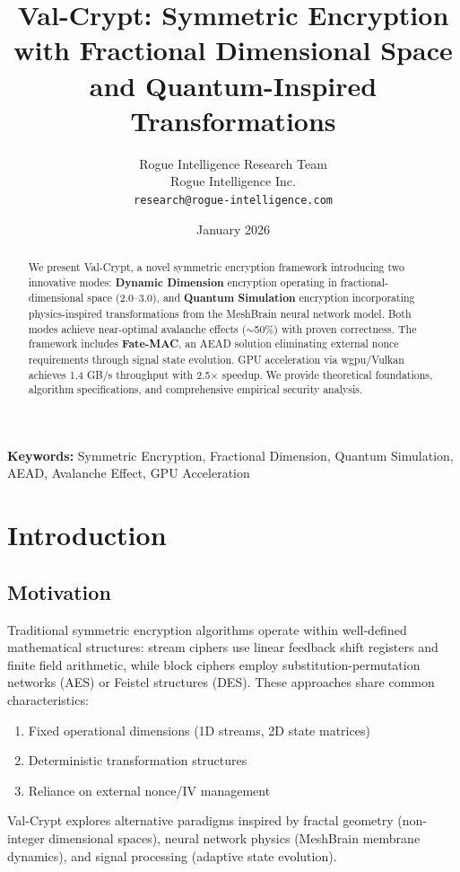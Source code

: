 \documentclass[11pt,a4paper]{article}
\title{Val-Crypt: Symmetric Encryption with Fractional Dimensional Space and Quantum-Inspired Transformations}
\author{
    Rogue Intelligence Research Team\\
    Rogue Intelligence Inc.\\
    \texttt{research@rogue-intelligence.com}
}
\date{January 2026}
\begin{document}
\maketitle

\begin{abstract}
We present Val-Crypt, a novel symmetric encryption framework introducing two innovative modes: \textbf{Dynamic Dimension} encryption operating in fractional-dimensional space (2.0--3.0), and \textbf{Quantum Simulation} encryption incorporating physics-inspired transformations from the MeshBrain neural network model. Both modes achieve near-optimal avalanche effects ($\sim$50\%) with proven correctness. The framework includes \textbf{Fate-MAC}, an AEAD solution eliminating external nonce requirements through signal state evolution. GPU acceleration via wgpu/Vulkan achieves 1.4 GB/s throughput with 2.5$\times$ speedup. We provide theoretical foundations, algorithm specifications, and comprehensive empirical security analysis.
\end{abstract}

\textbf{Keywords:} Symmetric Encryption, Fractional Dimension, Quantum Simulation, AEAD, Avalanche Effect, GPU Acceleration

\section{Introduction}

\subsection{Motivation}

Traditional symmetric encryption algorithms operate within well-defined mathematical structures: stream ciphers use linear feedback shift registers and finite field arithmetic, while block ciphers employ substitution-permutation networks (AES) or Feistel structures (DES). These approaches share common characteristics:

\begin{enumerate}
    \item Fixed operational dimensions (1D streams, 2D state matrices)
    \item Deterministic transformation structures
    \item Reliance on external nonce/IV management
\end{enumerate}

Val-Crypt explores alternative paradigms inspired by fractal geometry (non-integer dimensional spaces), neural network physics (MeshBrain membrane dynamics), and signal processing (adaptive state evolution).
\end{document}
